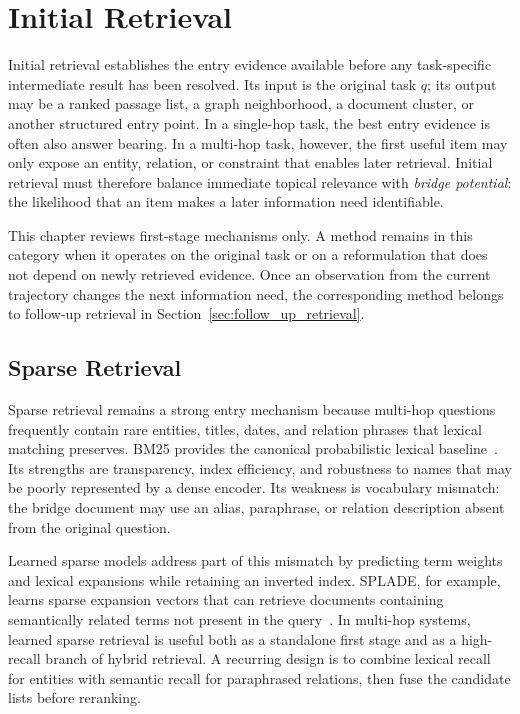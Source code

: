 \section{Initial Retrieval}
\label{sec:initial_retrieval}

Initial retrieval establishes the entry evidence available before any task-specific intermediate result has been resolved. Its input is the original task $q$; its output may be a ranked passage list, a graph neighborhood, a document cluster, or another structured entry point. In a single-hop task, the best entry evidence is often also answer bearing. In a multi-hop task, however, the first useful item may only expose an entity, relation, or constraint that enables later retrieval. Initial retrieval must therefore balance immediate topical relevance with \emph{bridge potential}: the likelihood that an item makes a later information need identifiable.

This chapter reviews first-stage mechanisms only. A method remains in this category when it operates on the original task or on a reformulation that does not depend on newly retrieved evidence. Once an observation from the current trajectory changes the next information need, the corresponding method belongs to follow-up retrieval in Section~\ref{sec:follow_up_retrieval}.

\subsection{Sparse Retrieval}
\label{subsec:sparse_retrieval}

Sparse retrieval remains a strong entry mechanism because multi-hop questions frequently contain rare entities, titles, dates, and relation phrases that lexical matching preserves. BM25 provides the canonical probabilistic lexical baseline~\cite{robertson2009bm25}. Its strengths are transparency, index efficiency, and robustness to names that may be poorly represented by a dense encoder. Its weakness is vocabulary mismatch: the bridge document may use an alias, paraphrase, or relation description absent from the original question.

Learned sparse models address part of this mismatch by predicting term weights and lexical expansions while retaining an inverted index. SPLADE, for example, learns sparse expansion vectors that can retrieve documents containing semantically related terms not present in the query~\cite{formal2021splade}. In multi-hop systems, learned sparse retrieval is useful both as a standalone first stage and as a high-recall branch of hybrid retrieval. A recurring design is to combine lexical recall for entities with semantic recall for paraphrased relations, then fuse the candidate lists before reranking.

